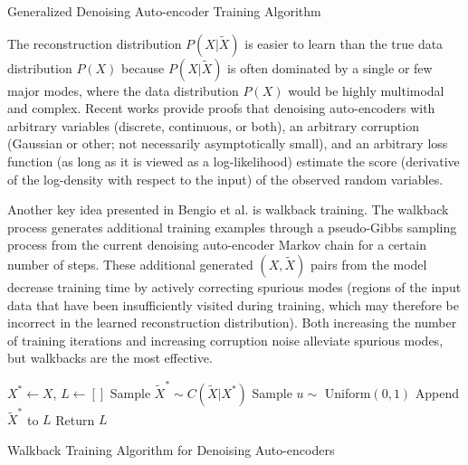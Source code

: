 \begin{algorithm}[h!]
	\caption{ Generalized Denoising Auto-encoder Training Algorithm }
\end{algorithm}

The reconstruction distribution \(P(X|\widetilde{X})\) is easier to learn than the true data distribution \(P(X)\) because \(P(X|\widetilde{X})\) is often dominated by a single or few major modes, where the data distribution \(P(X)\) would be highly multimodal and complex. Recent works \cite{alain12, bengio13a} provide proofs that denoising auto-encoders with arbitrary variables (discrete, continuous, or both), an arbitrary corruption (Gaussian or other; not necessarily asymptotically small), and an arbitrary loss function (as long as it is viewed as a log-likelihood) estimate the score (derivative of the log-density with respect to the input) of the observed random variables.

Another key idea presented in Bengio et al. \cite{bengio13a} is walkback training. The walkback process generates additional training examples through a pseudo-Gibbs sampling process from the current denoising auto-encoder Markov chain for a certain number of steps. These additional generated \((X,\widetilde{X})\) pairs from the model decrease training time by actively correcting spurious modes (regions of the input data that have been insufficiently visited during training, which may therefore be incorrect in the learned reconstruction distribution). Both increasing the number of training iterations and increasing corruption noise alleviate spurious modes, but walkbacks are the most effective.
\begin{algorithm}[h!]
	\(X^* \leftarrow X\), \(L \leftarrow []\)\;
	Sample \(\widetilde{X}^* \sim C(\widetilde{X}|X^*)\)\;
	Sample \(u \sim\) Uniform\((0,1)\)\;
	Append \(\widetilde{X}^*\) to \(L\)\;
	Return \(L\)\;
	\caption{ Walkback Training Algorithm for Denoising Auto-encoders }
\end{algorithm}





